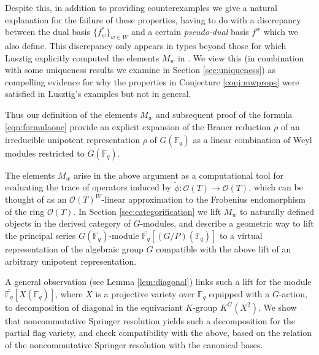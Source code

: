 \documentclass{amsart}
\theoremstyle{definition}
\renewcommand{\O}{\mathcal{O}}
\begin{document}
Despite this, in addition to providing counterexamples we give a natural explanation for the failure of these properties, having to do with a discrepancy between the dual basis $\{f_w^*\}_{w \in W}$ and a certain \emph{pseudo-dual} basis $f^w$ which we also define. This discrepancy only appears in types beyond those for which Lusztig explicitly computed the elements $M_w$ in \cite{L}. We view this (in combination with some uniqueness results we examine in Section \ref{sec:uniqueness}) as compelling evidence for why the properties in Conjecture \ref{conj:mwprops} were satisfied in Lusztig's examples but %
not in general.

Thus our definition of the elements $M_w$ and subsequent proof of the formula \eqref{eqn:formulaone} provide an explicit expansion of the Brauer reduction $\underline{\rho}$ of an irreducible unipotent representation $\rho$ of $G(\mathbb{F}_q)$ as a linear combination of Weyl modules restricted to 
$G(\mathbb{F}_q)$.

 The elements $M_w$ arise in the above argument as a computational tool for evaluating the trace of operators induced by $\tilde \phi\colon \O(T)\to \O(T)$, which can be thought of as an $\O(T)^W$-linear approximation to the Frobenius endomorphism of the ring $\O(T)$.
  In Section \ref{sec:categorification} we lift $M_w$ to naturally defined objects
  in the derived category of $G$-modules, and describe a geometric way to lift
  the principal series $G(\mathbb{F}_q)$-module $\overline{\mathbb{F}_q}[(G/P)(\mathbb{F}_q)]$ to a virtual representation of the algebraic group $G$ compatible with the above
  lift of an arbitrary unipotent representation. 
  
  A general observation (see Lemma \ref{lem:diagonal}) links
  such a lift for the module $\overline{\mathbb{F}_q}[X(\mathbb{F}_q)]$,
 where $X$ is a projective variety over $\mathbb{F}_q$ equipped with a $G$-action, 
 to decomposition of diagonal in the equivariant $K$-group $K^G(X^2)$. We show that 
   noncommutative Springer resolution yields such a decomposition for the partial flag variety,
   and check compatibility with the above, based on the relation of the noncommutative Springer
   resolution with the canonical bases.

  
\end{document}
